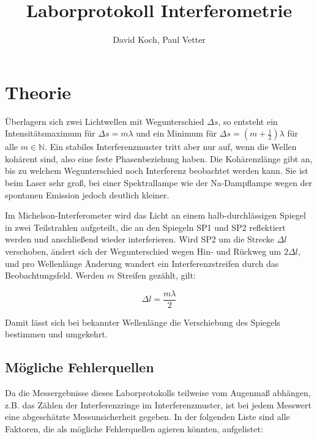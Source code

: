 \documentclass[
  headings=optiontotocandhead,
  twoside,
  openright,
  numbers=noenddot,
  toc=flat,
  11pt,
  parskip=full,
  listof=flat,
  bibliography=totoc,
  a4paper,
  DIV=14,
  BCOR=22mm,
  headheight=5mm,
  headinclude=true,
]{scrartcl}
\title{Laborprotokoll Interferometrie}
\author{David Koch, Paul Vetter}
\date{}
\begin{document}
\begin{titlepage}
\setcounter{page}{1}
\maketitle
\tableofcontents
\end{titlepage}

\setcounter{page}{2}
\renewcommand{\thepage}{\the\numexpr\value{page}-1\relax}

\section{Theorie}
\label{sec:theorie}
 
Überlagern sich zwei Lichtwellen mit Wegunterschied $\Delta s$, so entsteht ein Intensitätsmaximum für $\Delta s = m \lambda$ und ein Minimum für $\Delta s = (m + \frac{1}{2}) \lambda$ für alle $m \in \mathbb{N}$. Ein stabiles Interferenzmuster tritt aber nur auf, wenn die Wellen kohärent sind, also eine feste Phasenbeziehung haben. Die Kohärenzlänge gibt an, bis zu welchem Wegunterschied noch Interferenz beobachtet werden kann. Sie ist beim Laser sehr groß, bei einer Spektrallampe wie der Na-Dampflampe wegen der spontanen Emission jedoch deutlich kleiner.
 
Im Michelson-Interferometer wird das Licht an einem halb-durchlässigen Spiegel in zwei Teilstrahlen aufgeteilt, die an den Spiegeln SP1 und SP2 reflektiert werden und anschließend wieder interferieren. Wird SP2 um die Strecke $\Delta l$ verschoben, ändert sich der Wegunterschied wegen Hin- und Rückweg um $2 \Delta l$, und pro Wellenlänge Änderung wandert ein Interferenzstreifen durch das Beobachtungsfeld. Werden $m$ Streifen gezählt, gilt:


\begin{equation}
 \Delta l = \frac{m \lambda}{2} 
\label{eq:1.0.1}
\end{equation}

Damit lässt sich bei bekannter Wellenlänge die Verschiebung des Spiegels bestimmen und umgekehrt.
 
\subsection{Mögliche Fehlerquellen}
 
Da die Messergebnisse dieses Laborprotokolls teilweise vom Augenmaß abhängen, z.B. das Zählen der Interferenzringe im Interferenzmuster, ist bei jedem Messwert eine abgeschätzte Messunsicherheit gegeben. In der folgenden Liste sind alle Faktoren, die als mögliche Fehlerquellen agieren könnten, aufgelistet:
\end{document}
